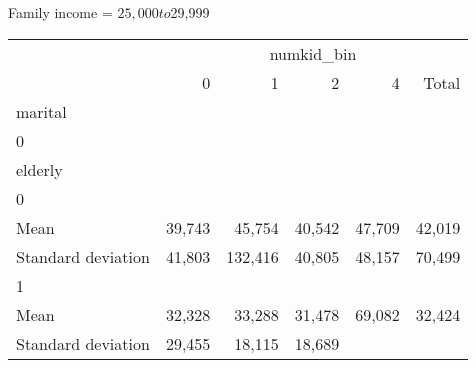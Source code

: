 Family income = $25,000 to $29,999
\begin{tabular}{llllll}
\cline{1-6}
\multicolumn{1}{c}{} &
  \multicolumn{5}{|c}{numkid\_bin} \\
\multicolumn{1}{c}{} &
  \multicolumn{1}{|r}{0} &
  \multicolumn{1}{r}{1} &
  \multicolumn{1}{r}{2} &
  \multicolumn{1}{r}{4} &
  \multicolumn{1}{r}{Total} \\
\cline{1-6}
\multicolumn{1}{l}{marital} &
  \multicolumn{1}{|r}{} &
  \multicolumn{1}{r}{} &
  \multicolumn{1}{r}{} &
  \multicolumn{1}{r}{} &
  \multicolumn{1}{r}{} \\
\multicolumn{1}{l}{\hspace{1em}0} &
  \multicolumn{1}{|r}{} &
  \multicolumn{1}{r}{} &
  \multicolumn{1}{r}{} &
  \multicolumn{1}{r}{} &
  \multicolumn{1}{r}{} \\
\multicolumn{1}{l}{\hspace{2em}elderly} &
  \multicolumn{1}{|r}{} &
  \multicolumn{1}{r}{} &
  \multicolumn{1}{r}{} &
  \multicolumn{1}{r}{} &
  \multicolumn{1}{r}{} \\
\multicolumn{1}{l}{\hspace{3em}0} &
  \multicolumn{1}{|r}{} &
  \multicolumn{1}{r}{} &
  \multicolumn{1}{r}{} &
  \multicolumn{1}{r}{} &
  \multicolumn{1}{r}{} \\
\multicolumn{1}{l}{\hspace{4em}Mean} &
  \multicolumn{1}{|r}{39,743} &
  \multicolumn{1}{r}{45,754} &
  \multicolumn{1}{r}{40,542} &
  \multicolumn{1}{r}{47,709} &
  \multicolumn{1}{r}{42,019} \\
\multicolumn{1}{l}{\hspace{4em}Standard deviation} &
  \multicolumn{1}{|r}{41,803} &
  \multicolumn{1}{r}{132,416} &
  \multicolumn{1}{r}{40,805} &
  \multicolumn{1}{r}{48,157} &
  \multicolumn{1}{r}{70,499} \\
\multicolumn{1}{l}{\hspace{3em}1} &
  \multicolumn{1}{|r}{} &
  \multicolumn{1}{r}{} &
  \multicolumn{1}{r}{} &
  \multicolumn{1}{r}{} &
  \multicolumn{1}{r}{} \\
\multicolumn{1}{l}{\hspace{4em}Mean} &
  \multicolumn{1}{|r}{32,328} &
  \multicolumn{1}{r}{33,288} &
  \multicolumn{1}{r}{31,478} &
  \multicolumn{1}{r}{69,082} &
  \multicolumn{1}{r}{32,424} \\
\multicolumn{1}{l}{\hspace{4em}Standard deviation} &
  \multicolumn{1}{|r}{29,455} &
  \multicolumn{1}{r}{18,115} &
  \multicolumn{1}{r}{18,689} &

\end{tabular}
